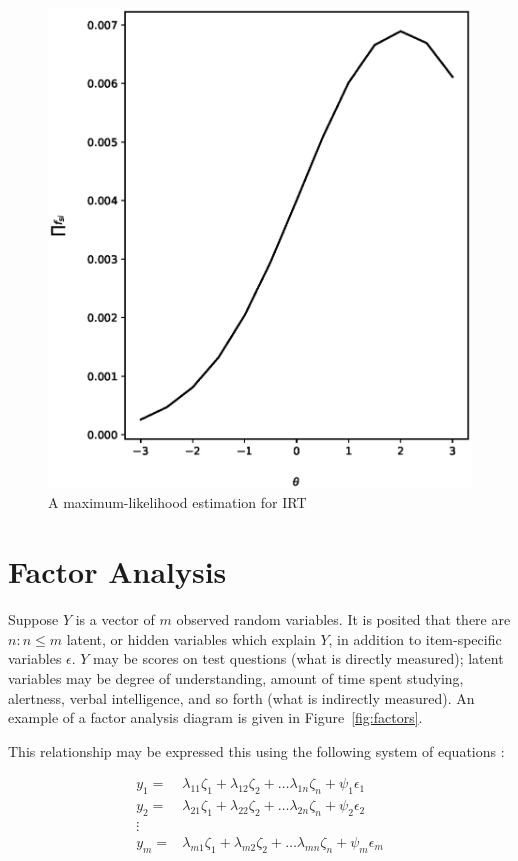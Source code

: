\begin{figure}[p!]
 \label{fig:mle}
 \includegraphics{fig/mle.eps} 
 \caption{A maximum-likelihood estimation for IRT}
\end{figure}

\section{Factor Analysis}

Suppose ${Y}$ is a vector of $m$ observed random variables.  It is
posited that there are $n : n \leq m$ latent, or hidden variables which explain
${Y}$, in addition to item-specific variables $\epsilon$.  ${Y}$
may be scores on test questions (what is directly measured); latent variables
may be degree of understanding, amount of time spent studying, alertness,
verbal intelligence, and so forth (what is indirectly measured).  An example
of a factor analysis diagram is given in Figure~\ref{fig:factors}.

This relationship may be expressed this using the following system of equations
\cite{mulaik2010}:

\begin{equation}
\begin{array}{ll}
\label{eq:factsystem}
  y_1  = & \lambda_{11} \zeta_{1}  +  \lambda_{12} \zeta_{2}  +  \ldots  \lambda_{1n} \zeta_{n}  +  \psi_1 \epsilon_1 \\
  y_2  = & \lambda_{21} \zeta_{1}  +  \lambda_{22} \zeta_{2}  +  \ldots  \lambda_{2n} \zeta_{n}  +  \psi_2 \epsilon_2 \\
  \vdots \\
  y_m  = & \lambda_{m1} \zeta_{1}  +  \lambda_{m2} \zeta_{2}  +  \ldots  \lambda_{mn} \zeta_{n}  +  \psi_m \epsilon_m \\
\end{array}
\end{equation}

